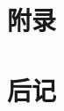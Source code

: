 \documentclass[
    UTF8,       %
    b5paper,    %
    10pt,       %
    oneside,    %
    openright,  %
    titlepage,  %
    final       %
]{ctexbook}
\begin{document}
    \appendix
    \maketitle
    \chapter{附录}


    \backmatter
    \chapter{后记}

\end{document}

